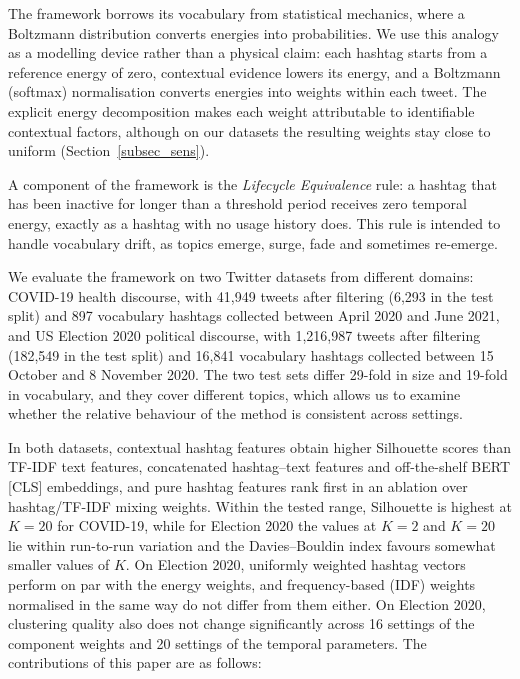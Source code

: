 \documentclass[pdflatex,sn-mathphys-num]{sn-jnl}%
\begin{document}
The framework borrows its vocabulary from statistical mechanics, where a Boltzmann distribution converts energies into probabilities. We use this analogy as a modelling device rather than a physical claim: each hashtag starts from a reference energy of zero, contextual evidence lowers its energy, and a Boltzmann (softmax) normalisation converts energies into weights within each tweet. The explicit energy decomposition makes each weight attributable to identifiable contextual factors, although on our datasets the resulting weights stay close to uniform (Section~\ref{subsec_sens}).

A component of the framework is the \emph{Lifecycle Equivalence} rule: a hashtag that has been inactive for longer than a threshold period receives zero temporal energy, exactly as a hashtag with no usage history does. This rule is intended to handle vocabulary drift, as topics emerge, surge, fade and sometimes re-emerge.

We evaluate the framework on two Twitter datasets from different domains: COVID-19 health discourse, with 41,949 tweets after filtering (6,293 in the test split) and 897 vocabulary hashtags collected between April 2020 and June 2021, and US Election 2020 political discourse, with 1,216,987 tweets after filtering (182,549 in the test split) and 16,841 vocabulary hashtags collected between 15 October and 8 November 2020. The two test sets differ 29-fold in size and 19-fold in vocabulary, and they cover different topics, which allows us to examine whether the relative behaviour of the method is consistent across settings.

In both datasets, contextual hashtag features obtain higher Silhouette scores than TF-IDF text features, concatenated hashtag--text features and off-the-shelf BERT [CLS] embeddings, and pure hashtag features rank first in an ablation over hashtag/TF-IDF mixing weights. Within the tested range, Silhouette is highest at $K=20$ for COVID-19, while for Election 2020 the values at $K=2$ and $K=20$ lie within run-to-run variation and the Davies--Bouldin index favours somewhat smaller values of $K$. On Election 2020, uniformly weighted hashtag vectors perform on par with the energy weights, and frequency-based (IDF) weights normalised in the same way do not differ from them either. On Election 2020, clustering quality also does not change significantly across 16 settings of the component weights and 20 settings of the temporal parameters. The contributions of this paper are as follows:
\end{document}
